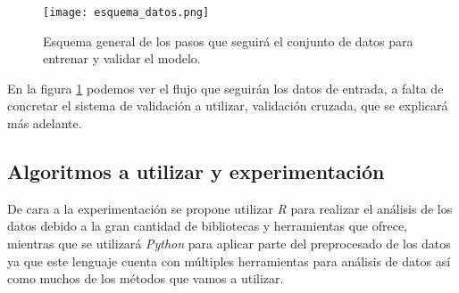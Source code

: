 \begin{figure}[H]
    \centering
	  \texttt{[image: esquema\_datos.png]}
    \caption{Esquema general de los pasos que seguirá el conjunto de datos para entrenar y validar el modelo.}
	 \label{fig:esquema_datos}
\end{figure}

En la figura \ref{fig:esquema_datos} podemos ver el flujo que seguirán los datos de entrada, a falta de concretar el sistema de validación a utilizar, validación cruzada, que se explicará más adelante.

\newpage

\subsection{Algoritmos a utilizar y experimentación}

De cara a la experimentación se propone utilizar \textit{R} para realizar el análisis de los datos debido a la gran cantidad de bibliotecas y herramientas que ofrece, mientras que se utilizará \textit{Python} para aplicar parte del preprocesado de los datos ya que este lenguaje cuenta con múltiples herramientas para análisis de datos así como muchos de los métodos que vamos a utilizar.




\newpage
